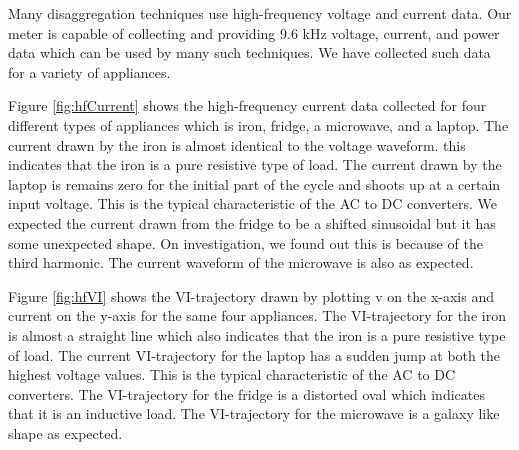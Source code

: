 Many disaggregation techniques use high-frequency voltage and current data. Our meter is capable of collecting and providing 9.6 kHz voltage, current, and power data which can be used by many such techniques. We have collected such data for a variety of appliances.

Figure \ref{fig:hfCurrent} shows the high-frequency current data collected for four different types of appliances which is iron, fridge, a microwave, and a laptop. The current drawn by the iron is almost identical to the voltage waveform. this indicates that the iron is a pure resistive type of load.
The current drawn by the laptop is remains zero for the initial part of the cycle and shoots up at a certain input voltage. This is the typical characteristic of the AC to DC converters. We expected the current drawn from the fridge to be a shifted sinusoidal but it has some unexpected shape. On investigation, we found out this is because of the third harmonic. The current waveform of the microwave is also as expected.

Figure \ref{fig:hfVI} shows the VI-trajectory drawn by plotting v on the x-axis and current on the y-axis for the same four appliances. The VI-trajectory for the iron is almost a straight line which also indicates that the iron is a pure resistive type of load. The current VI-trajectory for the laptop has a sudden jump at both the highest voltage values. This is the typical characteristic of the AC to DC converters. The VI-trajectory for the fridge is a distorted oval which indicates that it is an inductive load. The VI-trajectory for the microwave is a galaxy like shape as expected.

